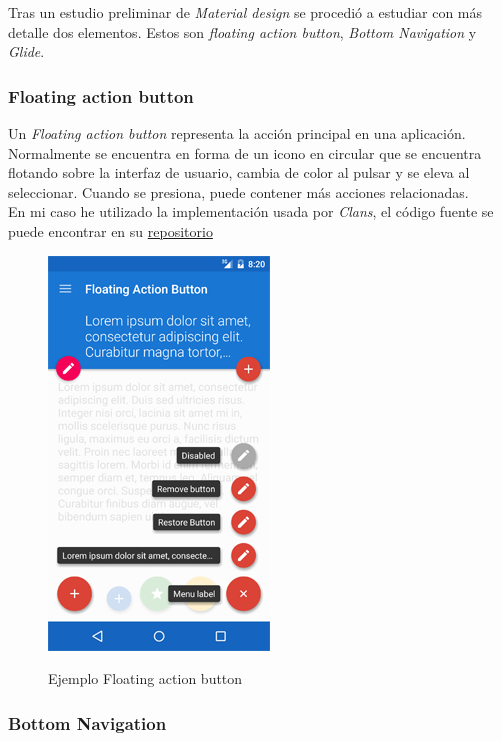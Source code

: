 Tras un estudio preliminar de \textit{Material design} se procedió a estudiar con más detalle dos elementos. Estos son \textit{floating action button}, \textit{Bottom Navigation} y \textit{Glide}.

\subsubsection{Floating action button}

Un \textit{Floating action button} representa la acción principal en una aplicación. Normalmente se encuentra en forma de un icono en circular que se encuentra flotando sobre la interfaz de usuario, cambia de color al pulsar y se eleva al seleccionar. Cuando se presiona, puede contener más acciones relacionadas.\\

En mi caso he utilizado la implementación usada por \textit{Clans}, el código fuente se puede encontrar en su \href{https://github.com/Clans/FloatingActionButton}{repositorio}

\begin{figure}[H] %
\centering
\includegraphics[scale=0.5]{imagenes/fab.png}  %
\label{fab}
\caption{Ejemplo Floating action button}
\end{figure}

\subsubsection{Bottom Navigation}

